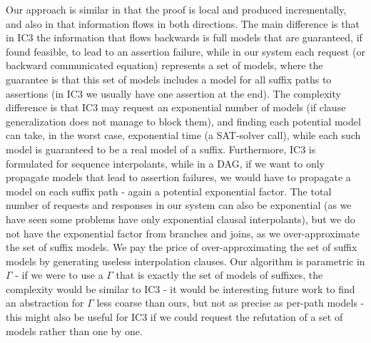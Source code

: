 Our approach is similar in that the proof is local and produced incrementally, and also in that information flows in both directions.
The main difference is that in IC3 the information that flows backwards is full models that are guaranteed, if found feasible, 
to lead to an assertion failure, while in our system each request (or backward communicated equation) represents a set of models, 
where the guarantee is that this set of models includes a model for all suffix paths to assertions (in IC3 we usually have one assertion at the end). 
The complexity difference is that IC3 may request an exponential number of models (if clause generalization does not manage to block them), and finding each potential model can take, in the worst case, exponential time (a SAT-solver call), while each such model is guaranteed to be a real model of a suffix. 
Furthermore, IC3 is formulated for sequence interpolants, while in a DAG, if we want to only propagate models that lead to assertion failures,
we would have to propagate a model on each suffix path - again a potential exponential factor.
The total number of requests and responses in our system can also be exponential (as we have seen some problems have only exponential clausal interpolants), but we do not have the exponential factor from branches and joins, as we over-approximate the set of suffix models.
We pay the price of over-approximating the set of suffix models by generating useless interpolation clauses.
Our algorithm is parametric in $\Gamma$ - if we were to use a $\Gamma$ that is exactly the set of models of suffixes, 
the complexity would be similar to IC3 - it would be interesting future work to find an abstraction for $\Gamma$ less coarse than ours,
but not as precise as per-path models - this might also be useful for IC3 if we could request the refutation of a set of models rather than one by one.
%
%
